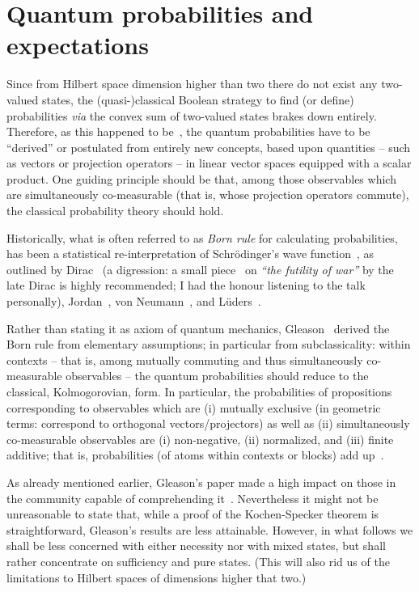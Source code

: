 \documentclass[%
  twocolumn,
 showpacs,
 showkeys,
 preprintnumbers,
 amsmath,amssymb,
 aps,
  pra,
  longbibliography,
 floatfix,
 ]{revtex4-1}
\begin{document}
\section{Quantum probabilities and expectations}

Since from Hilbert space dimension higher than two there do not exist any two-valued states,
the (quasi-)classical Boolean strategy to find (or define) probabilities {\it via}
the convex sum of two-valued states brakes down entirely.
Therefore, as this happened to be~\cite{Dirac621,dirac,Jordan1927,vonNeumann:1927:WAQ,v-neumann-49,v-neumann-55},
the quantum probabilities have to be ``derived'' or postulated from
entirely new concepts, based upon quantities -- such as vectors or projection operators --
in linear vector spaces equipped with a scalar product.
One guiding principle should be that, among those observables which are simultaneously co-measurable (that is, whose
projection operators commute), the classical probability theory should hold.

Historically, what is often referred to as
{\em Born rule}
for calculating probabilities,
has been a statistical re-interpretation of Schr\"odinger's
wave function~\cite[Footnote 1, Anmerkung bei der Korrektur, p.~865]{born-26-1},
as outlined by Dirac~\cite{Dirac621,dirac}
(a digression: a small piece~\cite{dirac-81} on {\em ``the futility of war''}
by the late Dirac is highly recommended; I had the honour listening to the talk personally), Jordan~\cite{Jordan1927},
von Neumann~\cite{vonNeumann:1927:WAQ,v-neumann-49,v-neumann-55}, and
L\"uders~\cite{Luders-1950,Luders-1950e,Busch2009}.

Rather than stating it as axiom of quantum mechanics,
Gleason~\cite{Gleason}
derived the Born rule from elementary assumptions; in particular from subclassicality: within contexts -- that is,
among mutually commuting and thus simultaneously co-measurable observables -- the
quantum probabilities should reduce to the classical, Kolmogorovian, form.
In particular, the probabilities of propositions corresponding to observables which are (i) mutually exclusive
(in geometric terms: correspond to orthogonal vectors/projectors)
as well as (ii) simultaneously co-measurable observables
are (i) non-negative, (ii) normalized, and (iii) finite additive; that is, probabilities
(of atoms within contexts or blocks)
add up~\cite[Section~1]{sep-probability-interpret}.

As already mentioned earlier, Gleason's paper made a high impact on those in the community capable
of comprehending it~\cite{ZirlSchl-65,kamber65,bell-66,kochen1,c-k-m,r:dvur-93,pitowsky:218,rich-bridge}.
Nevertheless it might not be unreasonable to state that, while a proof of the Kochen-Specker theorem is straightforward,
Gleason's results are less attainable.
However, in what follows we shall be less concerned with either necessity nor with mixed states,
but shall rather concentrate on sufficiency and pure states.
(This will also rid us of the limitations to Hilbert spaces of dimensions higher that two.)
\end{document}
